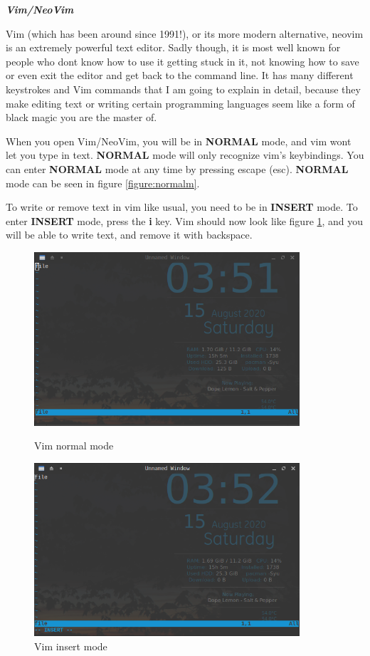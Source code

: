 \documentclass[12pt, letterpaper, twoside]{article}
\begin{document}
\newpage
\textit{\textbf{Vim/NeoVim}}

Vim (which has been around since 1991!), or its more modern alternative, neovim is an extremely powerful text editor. Sadly though, it is most well known for people who dont know how to use it getting stuck in it, not knowing how to save or even exit the editor and get back to the command line. It has many different keystrokes and Vim commands that I am going to explain in detail, because they make editing text or writing certain programming languages seem like a form of black magic you are the master of.

When you open Vim/NeoVim, you will be in \textbf{NORMAL} mode, and vim wont let you type in text. \textbf{NORMAL} mode will only recognize vim's keybindings. You can enter \textbf{NORMAL} mode at any time by pressing escape (esc). \textbf{NORMAL} mode can be seen in figure \ref{figure:normalm}.

To write or remove text in vim like usual, you need to be in \textbf{INSERT} mode. To enter \textbf{INSERT} mode, press the \textbf{i} key. Vim should now look like figure \ref{figure:insertm}, and you will be able to write text, and remove it with backspace.


\begin{figure} [!htb]
  \includegraphics[width=0.88\textwidth]{normalm}
  \caption{Vim normal mode}\label{figure:normalm}
\endminipage\hfill
{}%
  \includegraphics[width=0.88\textwidth]{insertm}
  \caption{Vim insert mode}\label{figure:insertm}
\endminipage
\end{figure}
\end{document}
